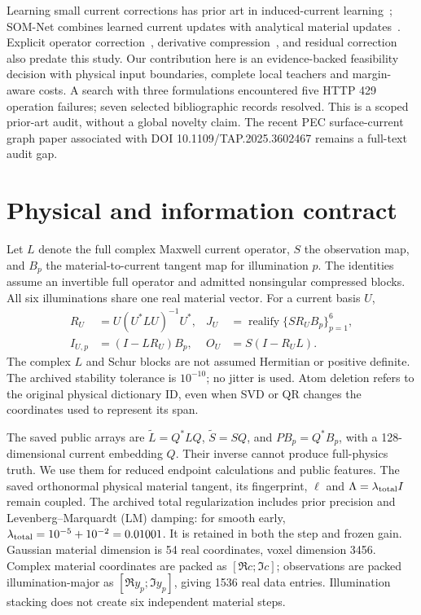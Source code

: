\documentclass[11pt,a4paper]{article}
\newcommand{\op}[1]{\operatorname{#1}}
\begin{document}
Learning small current corrections has prior art in induced-current learning~\cite{wei}; SOM-Net combines learned current updates with analytical material updates~\cite{som}. Explicit operator correction~\cite{lunz}, derivative compression~\cite{dino}, and residual correction~\cite{residual} also predate this study. Our contribution here is an evidence-backed feasibility decision with physical input boundaries, complete local teachers and margin-aware costs. A search with three formulations encountered five HTTP 429 operation failures; seven selected bibliographic records resolved. This is a scoped prior-art audit, without a global novelty claim. The recent PEC surface-current graph paper associated with DOI 10.1109/TAP.2025.3602467 remains a full-text audit gap.

\section{Physical and information contract}
Let $L$ denote the full complex Maxwell current operator, $S$ the observation map, and $B_p$ the material-to-current tangent map for illumination $p$. The identities assume an invertible full operator and admitted nonsingular compressed blocks. All six illuminations share one real material vector. For a current basis $U$,
\begin{align}
 R_U&=U(U^*LU)^{-1}U^*, &J_U&=\op{realify}\{SR_UB_p\}_{p=1}^6,\\
 I_{U,p}&=(I-LR_U)B_p, &O_U&=S(I-R_UL).
\end{align}
The complex $L$ and Schur blocks are not assumed Hermitian or positive definite. The archived stability tolerance is $10^{-10}$; no jitter is used. Atom deletion refers to the original physical dictionary ID, even when SVD or QR changes the coordinates used to represent its span.

The saved public arrays are $\widetilde L=Q^*LQ$, $\widetilde S=SQ$, and $PB_p=Q^*B_p$, with a 128-dimensional current embedding $Q$. Their inverse cannot produce full-physics truth. We use them for reduced endpoint calculations and public features. The saved orthonormal physical material tangent, its fingerprint, $\ell$ and $\Lambda=\lambda_{\rm total}I$ remain coupled. The archived total regularization includes prior precision and Levenberg--Marquardt (LM) damping: for smooth early, $\lambda_{\rm total}=10^{-5}+10^{-2}=0.01001$. It is retained in both the step and frozen gain. Gaussian material dimension is 54 real coordinates, voxel dimension 3456. Complex material coordinates are packed as $[\Re c;\Im c]$; observations are packed illumination-major as $[\Re y_p;\Im y_p]$, giving 1536 real data entries. Illumination stacking does not create six independent material steps.
\end{document}
